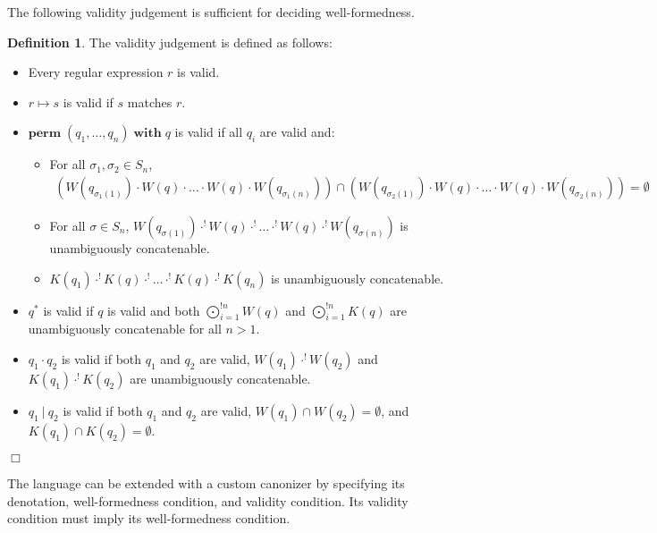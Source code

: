 \documentclass[a4paper,11pt] {article}
\theoremstyle{definition}
\newtheorem{definition}[theorem]{Definition}
\newcommand{\perm}{ \textbf{perm}\; }
\newcommand{\with}{ \;\textbf{with}\; }
\begin{document}
The following validity judgement
is sufficient for deciding well-formedness.
\begin{definition}
  The validity judgement is defined as follows:
  \begin{itemize}
  \item Every regular expression $r$ is valid.
  \item $r \mapsto s$ is valid if $s$ matches $r$.
  \item $\perm(q_1, \ldots, q_n) \with q$ is valid if all $q_i$ are
    valid and:
    \begin{itemize}
    \item For all $\sigma_1, \sigma_2 \in S_n$,
      \begin{align*}
        (W(q_{\sigma_1(1)}) \cdot W(q) \cdot \ldots
        \cdot W(q) \cdot W(q_{\sigma_1(n)})) \cap
        (W(q_{\sigma_2(1)}) \cdot W(q) \cdot \ldots
        \cdot W(q) \cdot W(q_{\sigma_2(n)})) = \emptyset
      \end{align*}
    \item For all $\sigma \in S_n$,
      $W(q_{\sigma(1)}) \cdot^! W(q) \cdot^!
      \ldots \cdot^! W(q) \cdot^! W(q_{\sigma(n)})$
      is unambiguously concatenable.
    \item $K(q_1) \cdot^! K(q) \cdot^! \ldots
    \cdot^! K(q) \cdot^! K(q_n)$ is unambiguously
    concatenable.
    \end{itemize}
  \item $q^*$ is valid if $q$ is valid and both
    $\bigodot_{i=1}^{!n} W(q)$ and $\bigodot_{i=1}^{!n} K(q)$ are
    unambiguously concatenable for all $n > 1$.
  \item $q_1 \cdot q_2$ is valid if both $q_1$ and $q_2$ are valid,
    $W(q_1) \cdot^{!} W(q_2)$ and $K(q_1) \cdot^{!} K(q_2)$ are unambiguously
    concatenable.
  \item $q_1 ~|~ q_2$ is valid if both $q_1$ and $q_2$ are valid,
    $W(q_1) \cap W(q_2) = \emptyset$, and $K(q_1) \cap K(q_2) = \emptyset$.
  \end{itemize}
  \begin{flushright} $\Box$ \end{flushright}
\end{definition}
The language can be extended with a custom canonizer by specifying its
denotation, well-formedness condition, and validity condition. Its
validity condition must imply its well-formedness condition.
\end{document}
